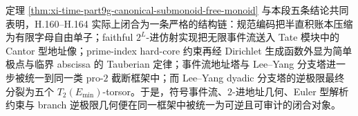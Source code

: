 \noindent
定理 \ref{thm:xi-time-part9g-canonical-submonoid-free-monoid} 与本段五条结论共同表明，H.160--H.164 实际上闭合为一条严格的结构链：规范编码把半直积账本压缩为有限字母自由单子；faithful \(2^L\)-进仿射实现把无限事件流送入 Tate 模块中的 Cantor 型地址像；prime-index hard-core 约束再经 Dirichlet 生成函数外显为简单极点与临界 abscissa 的 Tauberian 定律；事件流地址塔与 Lee--Yang 分支塔进一步被统一到同一类 pro-\(2\) 截断框架中；而 Lee--Yang dyadic 分支塔的逆极限最终分裂为五个 \(T_2(E_{\min})\)-torsor。于是，符号事件流、\(2\)-进地址几何、Euler 型解析约束与 branch 逆极限几何便在同一框架中被统一为可逆且可审计的闭合对象。

\endinput
